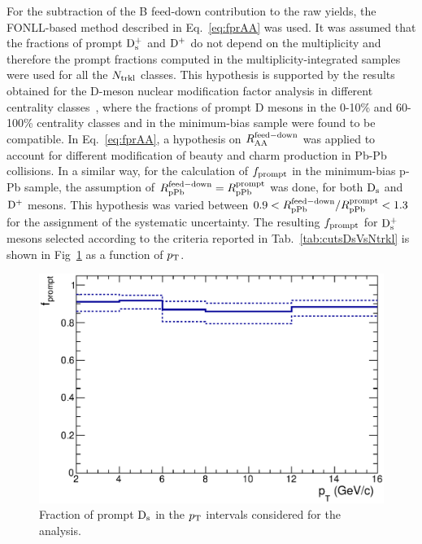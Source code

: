 For the subtraction of the B feed-down contribution to the raw yields, the FONLL-based method 
described in Eq.~\ref{eq:fprAA} was used. It was 
assumed that the fractions of prompt ${\rm D_s^+}$ and ${\rm D^+}$ do not depend on the 
multiplicity and therefore the prompt fractions computed in 
the multiplicity-integrated samples were used for all the $N_{\rm trkl}$ classes. 
This hypothesis is supported by the results obtained for the D-meson nuclear modification factor 
analysis in different centrality classes~\cite{ALICEPAS2017008}, 
where the fractions of prompt D mesons in the 0-10\% and 60-100\%
centrality classes and in the minimum-bias sample were found to be compatible. 
In Eq.~\ref{eq:fprAA}, a hypothesis on $R_{\rm AA}^{\rm feed-down}$
was applied to account for different modification of beauty and charm 
production in Pb-Pb collisions. In a similar way, for the calculation of $f_{\rm prompt}$ in 
the minimum-bias p-Pb sample, the assumption of $R_{\rm pPb}^{\rm feed-down} = R_{\rm pPb}^{\rm prompt}$ 
was done, for both ${\rm D_s}$ and ${\rm D^+}$ mesons.
This hypothesis was varied between $0.9 <R_{\rm pPb}^{\rm feed-down}/R_{\rm pPb}^{\rm prompt} <1.3$ for the assignment of the systematic uncertainty. 
The resulting $f_{\rm prompt}$ for ${\rm D_s^+}$ mesons selected according to the criteria reported
in Tab.~\ref{tab:cutsDsVsNtrkl} is shown in Fig~\ref{fig:DsfPrompt} as a function of $p_{\rm T}$.

\begin{figure}[!h]
\centering
 \includegraphics[width=.6\textwidth]{FigCap6/DsFprompt_1200Ntrkl.eps}
  \caption{Fraction of prompt ${\rm D_s}$ in the $p_{\rm T}$ intervals considered for the analysis.}
 \label{fig:DsfPrompt}
\end{figure}

